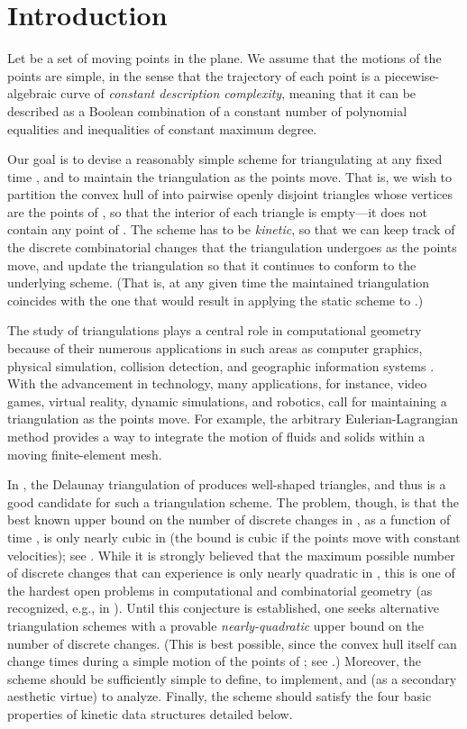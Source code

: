 \documentclass[11pt]{article}
\begin{document}
\section{Introduction}\label{Sec:intro}

Let  be a set of  moving points 
in the plane. We assume that the motions of the points are simple, in
the sense that the trajectory of each point is a piecewise-algebraic
curve of {\em constant description complexity}, meaning that it can be
described as a Boolean combination of a constant number of polynomial
equalities and inequalities of constant maximum degree.

Our goal is to devise a reasonably simple scheme for triangulating 
 at any fixed time , and to maintain the triangulation 
as the points move. That is, we wish to partition the 
convex hull  of  into pairwise openly disjoint 
triangles whose vertices are the points of , so that the 
interior of each triangle is empty---it does not contain any 
point of . The scheme has to be {\em kinetic}, so that we 
can keep track of the discrete combinatorial changes that the 
triangulation undergoes as the points move, and update the
triangulation so that it continues to conform to the underlying
scheme. (That is, at any given time  the maintained triangulation coincides with the one that would result in applying the static scheme to .)


The study of triangulations plays a central role in computational geometry because of
their numerous applications in such areas as computer graphics,
physical simulation, collision detection, and geographic information systems \cite{BernEpp, EdelsMeshes}. With the advancement in technology, many applications, for instance, video
games, virtual reality, dynamic simulations, and robotics, call for maintaining a triangulation as the
points move. For example, the arbitrary Eulerian-Lagrangian method \cite{Lagrangean} provides a way to integrate
the motion of 
fluids and solids within a moving finite-element mesh.



In , the Delaunay triangulation  of  produces well-shaped triangles, and thus 
is a good candidate for such a triangulation scheme.
The problem,
though, is that the best known upper bound on the number of 
discrete changes in , as a function of time ,
is only nearly cubic in  (the bound is cubic if the points move with constant velocities); see \cite{Stable,FU91,GMR91,SA:ds}. 
While it is strongly believed that the maximum possible number of 
discrete changes that  can experience is only nearly 
quadratic in , this is one of the hardest open problems in 
computational and combinatorial geometry (as recognized,
e.g., in \cite{TOPP}). 
Until this conjecture is established, one seeks alternative 
triangulation schemes with a provable \textit{nearly-quadratic} upper 
bound on the number of discrete changes. 
(This is best possible, since the convex hull itself can change  times during a simple motion of the points of ; see \cite{SA:ds}.)
Moreover, the scheme 
should be sufficiently simple to define, to implement, and 
(as a secondary aesthetic virtue) to analyze. 
Finally, the 
scheme should satisfy the four basic properties of kinetic data 
structures \cite{BG99} detailed below.
\end{document}
